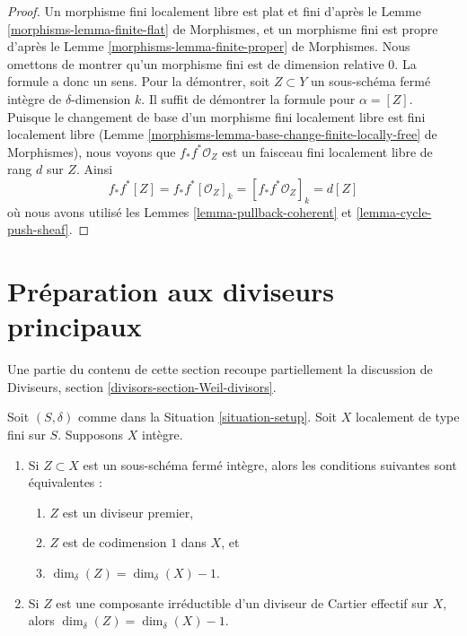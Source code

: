\begin{proof}
Un morphisme fini localement libre est plat et fini d'après le
Lemme \ref{morphisms-lemma-finite-flat} de Morphismes,
et un morphisme fini est propre
d'après le Lemme \ref{morphisms-lemma-finite-proper} de Morphismes.
Nous omettons de montrer qu'un morphisme fini
est de dimension relative $0$. La formule a donc un sens.
Pour la démontrer, soit $Z \subset Y$ un sous-schéma fermé intègre
de $\delta$-dimension $k$. Il suffit de démontrer la formule
pour $\alpha = [Z]$. Puisque le changement de base d'un morphisme fini localement libre
est fini localement libre
(Lemme \ref{morphisms-lemma-base-change-finite-locally-free} de Morphismes),
nous voyons que $f_*f^*\mathcal{O}_Z$ est un faisceau fini localement libre de
rang $d$ sur $Z$. Ainsi
$$
f_*f^*[Z] = f_*f^*[\mathcal{O}_Z]_k =
[f_*f^*\mathcal{O}_Z]_k = d[Z]
$$
où nous avons utilisé les Lemmes \ref{lemma-pullback-coherent} et
\ref{lemma-cycle-push-sheaf}.
\end{proof}








\section{Préparation aux diviseurs principaux}
\label{section-preparation-principal-divisors}

\noindent
Une partie du contenu de cette section recoupe partiellement la
discussion de Diviseurs, section \ref{divisors-section-Weil-divisors}.

\begin{lemma}
\label{lemma-divisor-delta-dimension}
Soit $(S, \delta)$ comme dans la Situation \ref{situation-setup}.
Soit $X$ localement de type fini sur $S$. Supposons $X$
intègre.
\begin{enumerate}
\item Si $Z \subset X$ est un sous-schéma fermé intègre, alors
les conditions suivantes sont équivalentes :
\begin{enumerate}
\item $Z$ est un diviseur premier,
\item $Z$ est de codimension $1$ dans $X$, et
\item $\dim_\delta(Z) = \dim_\delta(X) - 1$.
\end{enumerate}
\item Si $Z$ est une composante irréductible d'un diviseur de Cartier
effectif sur $X$, alors $\dim_\delta(Z) = \dim_\delta(X) - 1$.
\end{enumerate}
\end{lemma}

